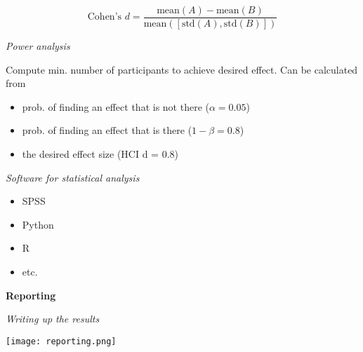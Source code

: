 $$\text{Cohen's } d = \frac{\text{mean}(A) - \text{mean}(B)}{\text{mean}([\text{std}(A), \text{std}(B)])}$$

\textit{Power analysis} \smallskip

Compute min. number of participants to achieve desired effect. Can be calculated from 

\begin{itemize}
    \item prob. of finding an effect that is not there ($\alpha = 0.05$)
    \item prob. of finding an effect that is there ($1-\beta = 0.8$)
    \item the desired effect size (HCI d = 0.8)
  
\end{itemize}

\textit{Software for statistical analysis} \smallskip

\begin{multicols}{4}
    \begin{itemize}
        \item SPSS
        \item Python
        \item R
        \item etc. 
    \end{itemize}
\end{multicols}


\textbf{Reporting} \smallskip


\textit{Writing up the results} \smallskip

\begin{center}
	\texttt{[image: reporting.png]}
\end{center}













